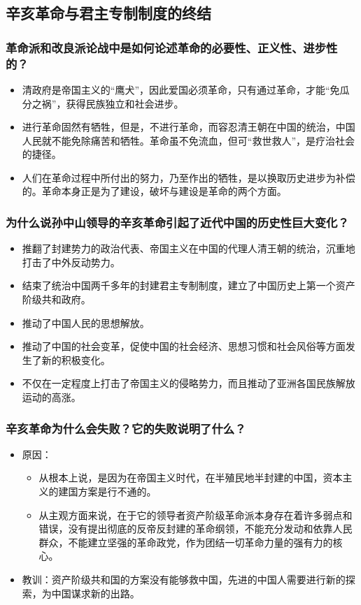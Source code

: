 \documentclass{article}
\begin{document}
\subsection{辛亥革命与君主专制制度的终结}

\subsubsection{革命派和改良派论战中是如何论述革命的必要性、正义性、进步性的？}
\begin{itemize}
    \item 清政府是帝国主义的“鹰犬”，因此爱国必须革命，只有通过革命，才能“免瓜分之祸”，获得民族独立和社会进步。
    \item 进行革命固然有牺牲，但是，不进行革命，而容忍清王朝在中国的统治，中国人民就不能免除痛苦和牺牲。革命虽不免流血，但可“救世救人”，是疗治社会的捷径。
    \item 人们在革命过程中所付出的努力，乃至作出的牺牲，是以换取历史进步为补偿的。革命本身正是为了建设，破坏与建设是革命的两个方面。
\end{itemize}


\subsubsection{为什么说孙中山领导的辛亥革命引起了近代中国的历史性巨大变化？}
\begin{itemize}
    \item 推翻了封建势力的政治代表、帝国主义在中国的代理人清王朝的统治，沉重地打击了中外反动势力。
    \item 结束了统治中国两千多年的封建君主专制制度，建立了中国历史上第一个资产阶级共和政府。
    \item 推动了中国人民的思想解放。
    \item 推动了中国的社会变革，促使中国的社会经济、思想习惯和社会风俗等方面发生了新的积极变化。
    \item 不仅在一定程度上打击了帝国主义的侵略势力，而且推动了亚洲各国民族解放运动的高涨。
\end{itemize}

\subsubsection{辛亥革命为什么会失败？它的失败说明了什么？}
\begin{itemize}
    \item 原因：
    \begin{itemize}
        \item 从根本上说，是因为在帝国主义时代，在半殖民地半封建的中国，资本主义的建国方案是行不通的。
        \item 从主观方面来说，在于它的领导者资产阶级革命派本身存在着许多弱点和错误，没有提出彻底的反帝反封建的革命纲领，不能充分发动和依靠人民群众，不能建立坚强的革命政党，作为团结一切革命力量的强有力的核心。
    \end{itemize}
    \item 教训：资产阶级共和国的方案没有能够救中国，先进的中国人需要进行新的探索，为中国谋求新的出路。
\end{itemize}
\end{document}
